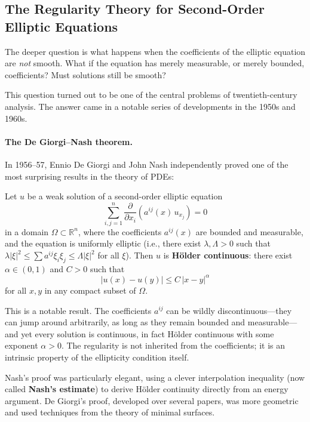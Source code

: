 \subsection{The Regularity Theory for Second-Order Elliptic Equations}

The deeper question is what happens when the coefficients of the elliptic equation are \emph{not} smooth. What if the equation has merely measurable, or merely bounded, coefficients? Must solutions still be smooth?

This question turned out to be one of the central problems of twentieth-century analysis. The answer came in a notable series of developments in the 1950s and 1960s.

\paragraph{The De Giorgi--Nash theorem.}
In 1956--57, Ennio De Giorgi and John Nash independently proved one of the most surprising results in the theory of PDEs:

\begin{theorem}\label{thm:de-giorgi-nash}
Let $u$ be a weak solution of a second-order elliptic equation
\[
    \sum_{i,j=1}^n \frac{\partial}{\partial x_i}\left(a^{ij}(x) \, u_{x_j}\right) = 0
\]
in a domain $\Omega \subset \mathbb{R}^n$, where the coefficients $a^{ij}(x)$ are bounded and measurable, and the equation is uniformly elliptic (i.e., there exist $\lambda, \Lambda > 0$ such that $\lambda |\xi|^2 \leq \sum a^{ij} \xi_i \xi_j \leq \Lambda |\xi|^2$ for all $\xi$). Then $u$ is \textbf{H\"older continuous}: there exist $\alpha \in (0, 1)$ and $C > 0$ such that
\[
    |u(x) - u(y)| \leq C \, |x - y|^\alpha
\]
for all $x, y$ in any compact subset of $\Omega$.
\end{theorem}

This is a notable result. The coefficients $a^{ij}$ can be wildly discontinuous---they can jump around arbitrarily, as long as they remain bounded and measurable---and yet every solution is continuous, in fact H\"older continuous with some exponent $\alpha > 0$. The regularity is not inherited from the coefficients; it is an intrinsic property of the ellipticity condition itself.

Nash's proof was particularly elegant, using a clever interpolation inequality (now called \textbf{Nash's estimate}) to derive H\"older continuity directly from an energy argument. De Giorgi's proof, developed over several papers, was more geometric and used techniques from the theory of minimal surfaces.

